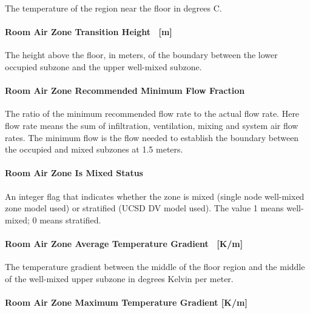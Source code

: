 The temperature of the region near the floor in degrees C.

\paragraph{Room Air Zone Transition Height~ {[}m{]}}\label{room-air-zone-transition-height-m}

The height above the floor, in meters, of the boundary between the lower occupied subzone and the upper well-mixed subzone.

\paragraph{\texorpdfstring{Room Air Zone Recommended Minimum Flow Fraction \protect\hyperlink{section-1}{}}{Room Air Zone Recommended Minimum Flow Fraction }}\label{room-air-zone-recommended-minimum-flow-fraction}

The ratio of the minimum recommended flow rate to the actual flow rate. Here flow rate means the sum of infiltration, ventilation, mixing and system air flow rates. The minimum flow is the flow needed to establish the boundary between the occupied and mixed subzones at 1.5 meters.

\paragraph{\texorpdfstring{Room Air Zone Is Mixed Status \protect\hyperlink{section-1}{}}{Room Air Zone Is Mixed Status }}\label{room-air-zone-is-mixed-status}

An integer flag that indicates whether the zone is mixed (single node well-mixed zone model used) or stratified (UCSD DV model used). The value 1 means well-mixed; 0 means stratified.

\paragraph{Room Air Zone Average Temperature Gradient~ {[}K/m{]}}\label{room-air-zone-average-temperature-gradient-km}

The temperature gradient between the middle of the floor region and the middle of the well-mixed upper subzone in degrees Kelvin per meter.

\paragraph{Room Air Zone Maximum Temperature Gradient {[}K/m{]}}\label{room-air-zone-maximum-temperature-gradient-km}

